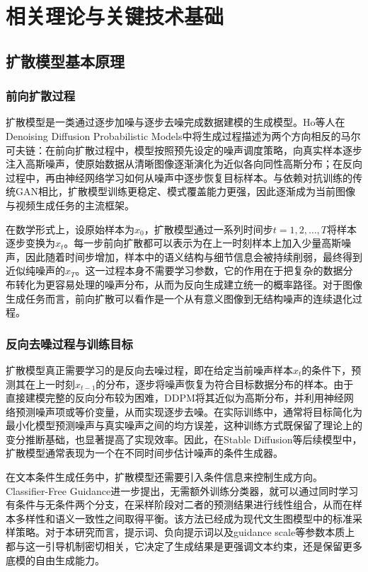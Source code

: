 
\chapter{相关理论与关键技术基础}

\section{扩散模型基本原理}

\subsection{前向扩散过程}

扩散模型是一类通过逐步加噪与逐步去噪完成数据建模的生成模型。Ho等人在Denoising Diffusion Probabilistic Models\cite{ref1}中将生成过程描述为两个方向相反的马尔可夫链：在前向扩散过程中，模型按照预先设定的噪声调度策略，向真实样本逐步注入高斯噪声，使原始数据从清晰图像逐渐演化为近似各向同性高斯分布；在反向过程中，再由神经网络学习如何从噪声中逐步恢复目标样本。与依赖对抗训练的传统GAN相比，扩散模型训练更稳定、模式覆盖能力更强，因此逐渐成为当前图像与视频生成任务的主流框架。

在数学形式上，设原始样本为$x_0$，扩散模型通过一系列时间步$t=1,2,\ldots,T$将样本逐步变换为$x_t$。每一步前向扩散都可以表示为在上一时刻样本上加入少量高斯噪声，因此随着时间步增加，样本中的语义结构与细节信息会被持续削弱，最终得到近似纯噪声的$x_T$。这一过程本身不需要学习参数，它的作用在于把复杂的数据分布转化为更容易处理的噪声分布，从而为反向生成建立统一的概率路径。对于图像生成任务而言，前向扩散可以看作是一个从有意义图像到无结构噪声的连续退化过程。

\subsection{反向去噪过程与训练目标}

扩散模型真正需要学习的是反向去噪过程，即在给定当前噪声样本$x_t$的条件下，预测其在上一时刻$x_{t-1}$的分布，逐步将噪声恢复为符合目标数据分布的样本。由于直接建模完整的反向分布较为困难，DDPM\cite{ref1}将其近似为高斯分布，并利用神经网络预测噪声项或等价变量，从而实现逐步去噪。在实际训练中，通常将目标简化为最小化模型预测噪声与真实噪声之间的均方误差，这种训练方式既保留了理论上的变分推断基础，也显著提高了实现效率。因此，在Stable Diffusion等后续模型中，扩散模型通常表现为一个在不同时间步估计噪声的条件生成器。

在文本条件生成任务中，扩散模型还需要引入条件信息来控制生成方向。Classifier-Free Guidance\cite{ref31}进一步提出，无需额外训练分类器，就可以通过同时学习有条件与无条件两个分支，在采样阶段对二者的预测结果进行线性组合，从而在样本多样性和语义一致性之间取得平衡。该方法已经成为现代文生图模型中的标准采样策略。对于本研究而言，提示词、负向提示词以及guidance scale等参数本质上都与这一引导机制密切相关，它决定了生成结果是更强调文本约束，还是保留更多底模的自由生成能力。

